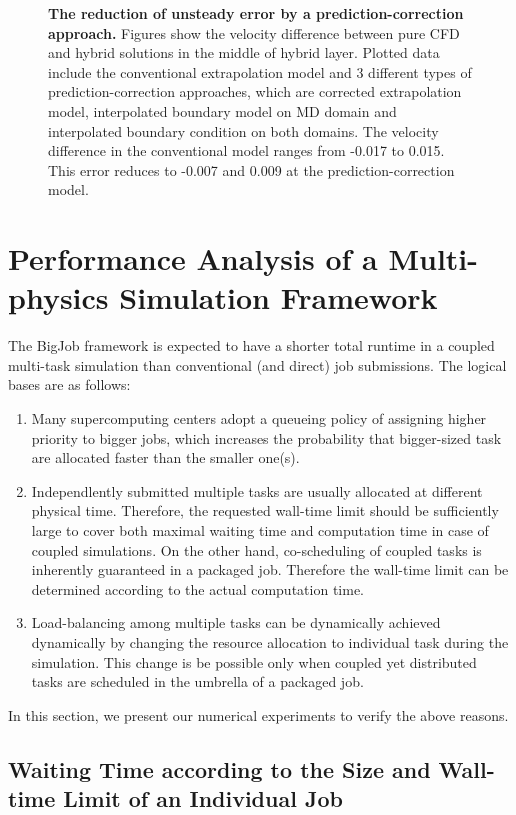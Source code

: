 \documentclass[preprint,12pt]{elsarticle}
\begin{document}
\begin{figure}
\caption[]{\small {\bf The reduction of unsteady error by a prediction-correction approach.}
Figures show the velocity difference between pure CFD and hybrid solutions
in the middle of hybrid layer. Plotted data include the conventional
extrapolation model and 3 different types of prediction-correction approaches,
which are corrected extrapolation model, interpolated boundary model on MD
domain and interpolated boundary condition on both domains. The velocity
difference in the conventional model ranges from -0.017 to 0.015.
This error reduces to -0.007 and 0.009 at the prediction-correction model.}
\label{Temporal2}
\end{figure}


\section{Performance Analysis of a Multi-physics Simulation Framework}
\label{sec:performance}

The BigJob framework is expected to have a shorter total runtime in a coupled multi-task simulation than conventional (and direct) job submissions. The logical bases are as follows:
\begin{enumerate}
\item Many supercomputing centers adopt a queueing policy of assigning higher priority to bigger jobs, which increases the probability that bigger-sized task are allocated faster than the smaller one(s).
\item Independlently submitted multiple tasks are usually allocated at different physical time. Therefore, the requested wall-time limit should be sufficiently large to cover both maximal waiting time and computation time in case of coupled simulations. On the other hand, co-scheduling of coupled tasks is inherently guaranteed in a packaged job. Therefore the wall-time limit can be determined according to the actual computation time.
\item Load-balancing among multiple tasks can be dynamically achieved dynamically by changing the resource allocation to individual task during the simulation. This change is be possible only when coupled yet distributed tasks are scheduled in the umbrella of a packaged job.
\end{enumerate}

In this section, we present our numerical experiments to verify the above reasons.


\subsection{Waiting Time according to the Size and Wall-time Limit of an Individual Job}
\label{sec:performance_preliminary}
\end{document}
